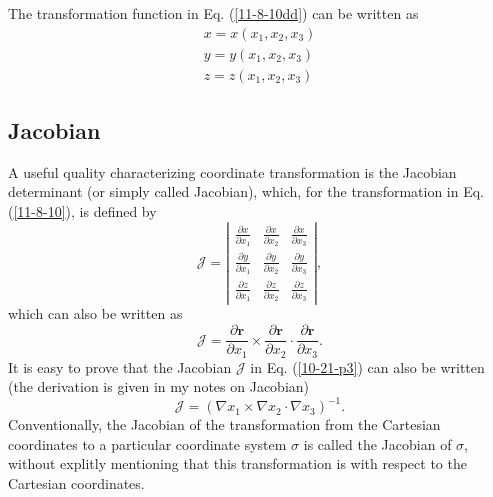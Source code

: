 \documentclass{llncs}
\begin{document}
The transformation function in Eq. (\ref{11-8-10dd}) can be written as
\begin{equation}
  \label{11-8-10} \begin{array}{l}
    x = x (x_1, x_2, x_3)\\
    y = y (x_1, x_2, x_3)\\
    z = z (x_1, x_2, x_3)
  \end{array}
\end{equation}

\subsection{Jacobian}

A useful quality characterizing coordinate transformation is the Jacobian
determinant (or simply called Jacobian), which, for the transformation in Eq.
(\ref{11-8-10}), is defined by
\begin{equation}
  \label{21-11-29-1} \mathcal{J}= \left|\begin{array}{ccc}
    \frac{\partial x}{\partial x_1} & \frac{\partial x}{\partial x_2} &
    \frac{\partial x}{\partial x_3}\\
    \frac{\partial y}{\partial x_1} & \frac{\partial y}{\partial x_2} &
    \frac{\partial y}{\partial x_3}\\
    \frac{\partial z}{\partial x_1} & \frac{\partial z}{\partial x_2} &
    \frac{\partial z}{\partial x_3}
  \end{array}\right|,
\end{equation}
which can also be written as
\begin{equation}
  \label{10-21-p3} \mathcal{J}= \frac{\partial \mathbf{r}}{\partial x_1}
  \times \frac{\partial \mathbf{r}}{\partial x_2} \cdot \frac{\partial
  \mathbf{r}}{\partial x_3} .
\end{equation}
It is easy to prove that the Jacobian $\mathcal{J}$ in Eq. (\ref{10-21-p3})
can also be written (the derivation is given in my notes on Jacobian)
\begin{equation}
  \label{10-21-p4} \mathcal{J}= (\nabla x_1 \times \nabla x_2 \cdot \nabla
  x_3)^{- 1} .
\end{equation}
Conventionally, the Jacobian of the transformation from the Cartesian
coordinates to a particular coordinate system $\sigma$ is called the Jacobian
of $\sigma$, without explitly mentioning that this transformation is with
respect to the Cartesian coordinates.
\end{document}
